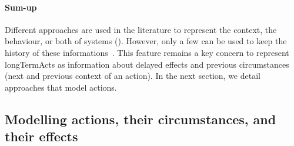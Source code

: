 \paragraph{Sum-up}
Different approaches are used in the literature to represent the context, the \gls{behaviour}, or both of systems (\cf {}).
However, only a few can be used to keep the history of these informations~\cite{DBLP:conf/seke/0001FNMKT14, DBLP:conf/models/0001FNMKBT14, 	DBLP:conf/dbpl/MoffittS17, DBLP:conf/icse/TaharaOH17, DBLP:conf/pervasive/HenricksenIR02, DBLP:conf/smartgridsec/0001FKNT14}.
This feature remains a key concern to represent \glspl{longTermAct} as information about delayed effects and previous \glspl{circumstance} (next and previous context of an action).
In the next section, we detail approaches that model actions.
	
\vfil

	
\subsection[Modelling actions, their circumstances, and their effects]{Modelling \glspl{action}, their \glspl{circumstance}, and their effects}


